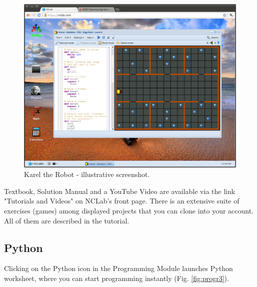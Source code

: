 \documentclass[article,A4,12pt]{llncs}
\begin{document}
\begin{figure}[!ht]
\begin{center}
\includegraphics[width=\textwidth]{img/progr2.png}
\end{center}
\caption{Karel the Robot - illustrative screenshot.}
\label{fig:progr2}
\end{figure}
\noindent
Textbook, Solution Manual and a YouTube Video are available via the link "Tutorials and Videos"
on NCLab's front page. There is an extensive suite of exercises (games) among 
displayed projects that you can clone into your account. All of them are described in the 
tutorial.

\subsection{Python}

Clicking on the Python icon in the Programming Module launches Python 
worksheet, where you can start programming instantly (Fig. \ref{fig:progr3}).
 
\end{document}
